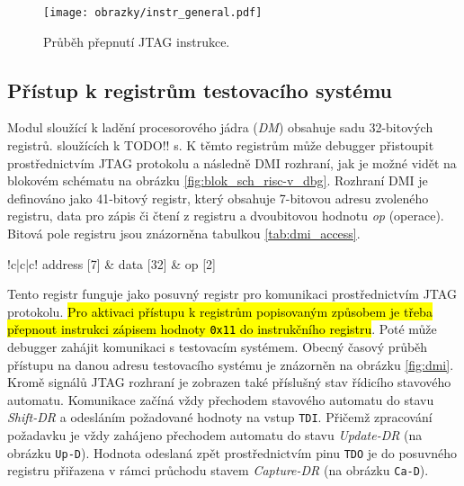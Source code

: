 \begin{figure}[!h]
  \begin{center}
    \texttt{[image: obrazky/instr\_general.pdf]}
  \end{center}
  \caption{Průběh přepnutí \acs{JTAG} instrukce.}
	\label{fig:jtag_instr}
\end{figure}

\subsection{Přístup k registrům testovacího systému}		\label{subsec:dm_reg_access}
Modul sloužící k ladění procesorového jádra (\textit{\acl{DM}}) obsahuje sadu 32-bitových registrů. sloužících k TODO!! s. K těmto registrům může debugger přistoupit prostřednictvím \acs{JTAG} protokolu a následně \acs{DMI} rozhraní, jak je možné vidět na blokovém schématu na obrázku \ref{fig:blok_sch_risc-v_dbg}. Rozhraní \acs{DMI} je definováno jako 41-bitový registr, který obsahuje 7-bitovou adresu zvoleného registru, data pro zápis či čtení z registru a dvoubitovou hodnotu \textit{op} (operace). Bitová pole registru jsou znázorněna tabulkou \ref{tab:dmi_access}. \cite{risc-v_dbg}

\begin{table}[H]
  \caption{Formát registru pro přístup k registrům testovacího systému. \cite{risc-v_dbg}}
  \begin{center}
  	\small
	  \begin{tabular}{!{\vrule width 1.2pt}c|c|c!{\vrule width 1.2pt}}
				address [7] & data [32] & op [2]\\
		\end{tabular}
  \end{center}
	\label{tab:dmi_access}
\end{table}

Tento registr funguje jako posuvný registr pro komunikaci prostřednictvím \acs{JTAG} protokolu. \hl{Pro aktivaci přístupu k registrům popisovaným způsobem je třeba přepnout instrukci zápisem hodnoty \texttt{0x11} do instrukčního registru}. Poté může debugger zahájit komunikaci s testovacím systémem. Obecný časový průběh přístupu na danou adresu testovacího systému je znázorněn na obrázku \ref{fig:dmi}. Kromě signálů \acs{JTAG} rozhraní je zobrazen také příslušný stav řídicího stavového automatu. Komunikace začíná vždy přechodem stavového automatu do stavu \textit{Shift-DR} a odesláním požadované hodnoty na vstup \texttt{TDI}. Přičemž zpracování požadavku je vždy zahájeno přechodem automatu do stavu \textit{Update-DR} (na obrázku \texttt{Up-D}). Hodnota odeslaná zpět prostřednictvím pinu \texttt{TDO} je do posuvného registru přiřazena v rámci průchodu stavem \textit{Capture-DR} (na obrázku \texttt{Ca-D}). \cite{risc-v_dbg}

